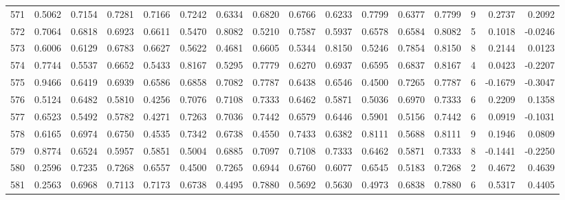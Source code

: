 \begin{tabular}{lrrrrrrrrrrrrrrr}
571 &      0.5062 &  0.7154 &  0.7281 &  0.7166 &  0.7242 &  0.6334 &  0.6820 &  0.6766 &  0.6233 &  0.7799 &   0.6377 &     0.7799 &      9 &                    0.2737 &                     0.2092 \\
572 &      0.7064 &  0.6818 &  0.6923 &  0.6611 &  0.5470 &  0.8082 &  0.5210 &  0.7587 &  0.5937 &  0.6578 &   0.6584 &     0.8082 &      5 &                    0.1018 &                    -0.0246 \\
573 &      0.6006 &  0.6129 &  0.6783 &  0.6627 &  0.5622 &  0.4681 &  0.6605 &  0.5344 &  0.8150 &  0.5246 &   0.7854 &     0.8150 &      8 &                    0.2144 &                     0.0123 \\
574 &      0.7744 &  0.5537 &  0.6652 &  0.5433 &  0.8167 &  0.5295 &  0.7779 &  0.6270 &  0.6937 &  0.6595 &   0.6837 &     0.8167 &      4 &                    0.0423 &                    -0.2207 \\
575 &      0.9466 &  0.6419 &  0.6939 &  0.6586 &  0.6858 &  0.7082 &  0.7787 &  0.6438 &  0.6546 &  0.4500 &   0.7265 &     0.7787 &      6 &                   -0.1679 &                    -0.3047 \\
576 &      0.5124 &  0.6482 &  0.5810 &  0.4256 &  0.7076 &  0.7108 &  0.7333 &  0.6462 &  0.5871 &  0.5036 &   0.6970 &     0.7333 &      6 &                    0.2209 &                     0.1358 \\
577 &      0.6523 &  0.5492 &  0.5782 &  0.4271 &  0.7263 &  0.7036 &  0.7442 &  0.6579 &  0.6446 &  0.5901 &   0.5156 &     0.7442 &      6 &                    0.0919 &                    -0.1031 \\
578 &      0.6165 &  0.6974 &  0.6750 &  0.4535 &  0.7342 &  0.6738 &  0.4550 &  0.7433 &  0.6382 &  0.8111 &   0.5688 &     0.8111 &      9 &                    0.1946 &                     0.0809 \\
579 &      0.8774 &  0.6524 &  0.5957 &  0.5851 &  0.5004 &  0.6885 &  0.7097 &  0.7108 &  0.7333 &  0.6462 &   0.5871 &     0.7333 &      8 &                   -0.1441 &                    -0.2250 \\
580 &      0.2596 &  0.7235 &  0.7268 &  0.6557 &  0.4500 &  0.7265 &  0.6944 &  0.6760 &  0.6077 &  0.6545 &   0.5183 &     0.7268 &      2 &                    0.4672 &                     0.4639 \\
581 &      0.2563 &  0.6968 &  0.7113 &  0.7173 &  0.6738 &  0.4495 &  0.7880 &  0.5692 &  0.5630 &  0.4973 &   0.6838 &     0.7880 &      6 &                    0.5317 &                     0.4405 \\

\end{tabular}

